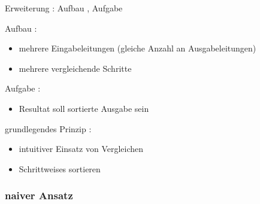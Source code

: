 \documentclass[ucs,9pt]{beamer}
\begin{document}
\begin{frame}{Erweiterung : Aufbau , Aufgabe}
 { Aufbau :\\ \begin{itemize}
        \item mehrere Eingabeleitungen (gleiche Anzahl an Ausgabeleitungen)
        \item mehrere vergleichende Schritte
    \end{itemize}}
 {Aufgabe :\\
        \begin{itemize}
            \item Resultat soll sortierte Ausgabe sein
            \end{itemize}
            }
 {grundlegendes Prinzip :
        \begin{itemize}
            \item intuitiver Einsatz von Vergleichen
            \item Schrittweises sortieren
        \end{itemize}}
\end{frame}

\subsubsection*{naiver Ansatz}
\end{document}
